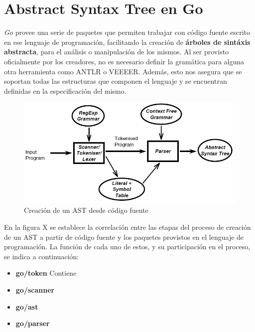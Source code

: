 \section{Abstract Syntax Tree en Go}
\textit{Go} provee una serie de paquetes que permiten trabajar con código fuente escrito en ese lenguaje de programación, facilitando la creación de \textbf{árboles de sintáxis abstracta}, para el análisis o manipulación de los mismos.
Al ser provisto oficialmente por los creadores, no es necesario definir la gramática para alguna otra herramienta como ANTLR o VEEEER.
Además, esto nos asegura que se soportan todas las estructuras que componen el lenguaje y se encuentran definidas en la especificación del mismo.

\begin{figure}[H]
  \includegraphics[width=12cm]{implementation/parsingpipeline}
  \centering
  \caption{Creación de un AST desde código fuente}
\end{figure}

En la figura X se establece la correlación entre las etapas del proceso de creación de un AST a partir de código fuente y los paquetes provistos en el lenguaje de programación.
La función de cada uno de estos, y su participación en el proceso, se indica a continuación:
\begin{itemize}
  \item \textbf{go/token} Contiene
  
  \item \textbf{go/scanner}
  
  \item \textbf{go/ast}
  
  \item \textbf{go/parser}
\end{itemize}
